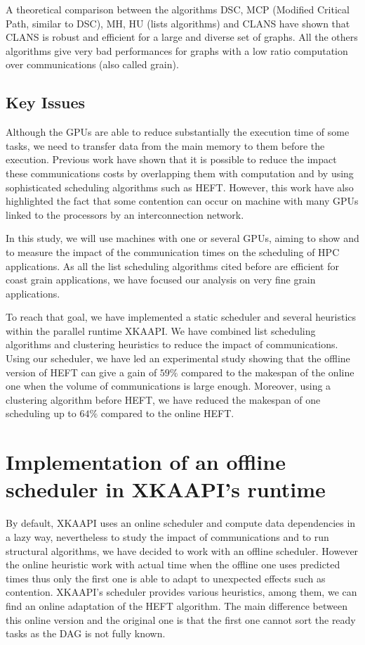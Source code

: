 \documentclass[10pt, conference, compsocconf,pdftex,dvipsnames]{IEEEtran}
\newcommand{\mytodo}[1]{\todo[inline]{#1}}
\begin{document}
A theoretical comparison\cite{khan1994comparison} between the algorithms DSC,
MCP (Modified Critical Path, similar to DSC), MH, HU (lists algorithms) and
CLANS have shown that CLANS is robust and efficient for a large and diverse
set of graphs. All the others algorithms give very bad performances for graphs
with a low ratio computation over communications (also called grain). 

\subsection{Key Issues}

Although the GPUs are able to reduce substantially the execution time of
some tasks, we need to transfer data from the main memory to them before
the execution. Previous work\cite{ferreiralima:hal-00735470} have shown
that it is possible to reduce the impact these communications costs by
overlapping them with computation and by using sophisticated scheduling
algorithms such as HEFT.  However, this work have also highlighted the
fact that some contention can occur on machine with many GPUs linked to
the processors by an interconnection network.

In this study, we will use machines with one or several GPUs, aiming to
show and to measure the impact of the communication times on the
scheduling of HPC applications. As all the list scheduling algorithms cited
before are efficient for coast grain applications, we have focused our
analysis on very fine grain applications. 

To reach that goal, we have implemented a static scheduler and several
heuristics within the parallel runtime XKAAPI. We have combined list
scheduling algorithms and clustering heuristics to reduce the impact of
communications. Using our scheduler, we have led an experimental study
showing that the offline version of HEFT can give a gain of $59\%$
compared to the makespan of the online one when the volume of
communications is large enough. Moreover, using a clustering algorithm
before HEFT, we have reduced the makespan of one scheduling up to $64\%$
compared to the online HEFT.
\mytodo{Outlines}

\section{Implementation of an offline scheduler in XKAAPI's runtime}
\label{sec:impl}
\mytodo{If needed, reduce these two paragraphs}

By default, XKAAPI uses an online scheduler and compute data dependencies in a
lazy way, nevertheless to study the impact of communications and to run
structural algorithms, we have decided to work with an offline scheduler.
However the online heuristic work with actual time when the offline one uses
predicted times thus only the first one is able to adapt to unexpected effects
such as contention. XKAAPI's scheduler provides various heuristics, among
them, we can find an online adaptation of the HEFT algorithm. The main
difference between this online version and the original one is that the first
one cannot sort the ready tasks as the DAG is not fully known.
\end{document}
